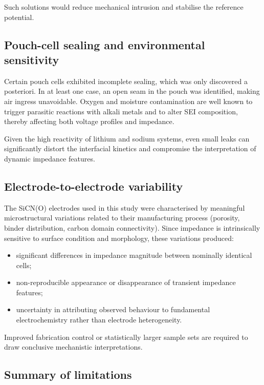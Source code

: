 Such solutions would reduce mechanical intrusion and stabilise the reference potential.

\subsection{Pouch-cell sealing and environmental sensitivity}

Certain pouch cells exhibited incomplete sealing, which was only discovered a posteriori.  
In at least one case, an open seam in the pouch was identified, making air ingress unavoidable. Oxygen and moisture contamination are well known to trigger parasitic reactions with alkali metals and to alter SEI composition, thereby affecting both voltage profiles and impedance.

Given the high reactivity of lithium and sodium systems, even small leaks can significantly distort the interfacial kinetics and compromise the interpretation of dynamic impedance features.

\subsection{Electrode-to-electrode variability}

The SiCN(O) electrodes used in this study were characterised by meaningful microstructural variations related to their manufacturing process (porosity, binder distribution, carbon domain connectivity). Since impedance is intrinsically sensitive to surface condition and morphology, these variations produced:

\begin{itemize}
    \item significant differences in impedance magnitude between nominally identical cells;
    \item non-reproducible appearance or disappearance of transient impedance features;
    \item uncertainty in attributing observed behaviour to fundamental electrochemistry rather than electrode heterogeneity.
\end{itemize}

Improved fabrication control or statistically larger sample sets are required to draw conclusive mechanistic interpretations.

\subsection{Summary of limitations}

